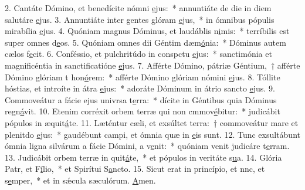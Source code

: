 2. Cantáte Dómino, et benedícite nómni \uline{e}jus:~* annuntiáte de die in diem salutáre \uline{e}jus.
3. Annuntiáte inter gentes glóram \uline{e}jus,~* in ómnibus pópulis mirabília \uline{e}jus.
4. Quóniam magnus Dóminus, et laudáblis n\uline{i}mis:~* terríbilis est super omnes d\uline{e}os.
5. Quóniam omnes dii Géntim dæm\uline{ó}nia:~* Dóminus autem cælos f\uline{e}cit.
6. Conféssio, et pulchritúdo in conspctu \uline{e}jus:~* sanctimónia et magnificéntia in sanctificatióne \uline{e}jus.
7. Afférte Dómino, pátriæ Géntium,~† afférte Dómino glóriam t hon\uline{ó}rem:~* afférte Dómino glóriam nómini \uline{e}jus.
8. Tóllite hóstias, et introíte in átra \uline{e}jus:~* adoráte Dóminum in átrio sancto \uline{e}jus.
9. Commoveátur a fácie ejus univrsa t\uline{e}rra:~* dícite in Géntibus quia Dóminus regn\uline{á}vit.
10. Etenim corréxit orbem terræ qui non cmmov\uline{é}bitur:~* judicábit pópulos in æquit\uline{á}te.
11. Læténtur cæli, et exsúltet terra:~† commoveátur mare et plenitdo \uline{e}jus:~* gaudébunt campi, et ómnia quæ in \uline{e}is sunt.
12. Tunc exsultábunt ómnia ligna silvárum a fácie Dómini, a v\uline{e}nit:~* quóniam venit judicáre t\uline{e}rram.
13. Judicábit orbem terræ in quit\uline{á}te,~* et pópulos in veritáte s\uline{u}a.
14. Glória Patr, et F\uline{í}lio,~* et Spirítui S\uline{a}ncto.
15. Sicut erat in princípio, et nnc, et s\uline{e}mper,~* et in sǽcula sæculórum. \uline{A}men.
